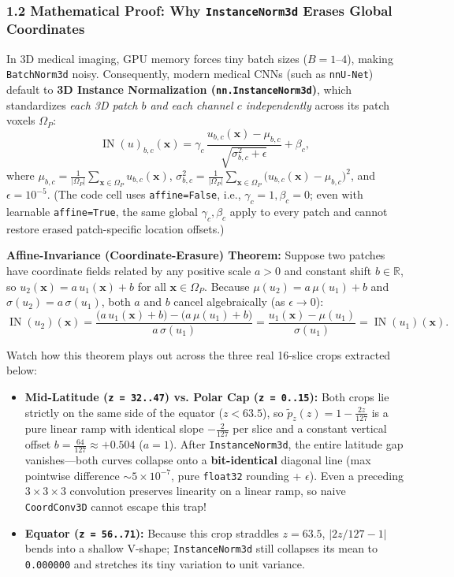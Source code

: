 \documentclass[10pt,a4paper]{article}
\renewcommand{\_}{\origunderscore\allowbreak}
\begin{document}
\subsubsection*{1.2 Mathematical Proof: Why \texttt{InstanceNorm3d} Erases Global Coordinates}
In 3D medical imaging, GPU memory forces tiny batch sizes ($B = 1$--$4$), making \texttt{BatchNorm3d} noisy. Consequently, modern medical CNNs (such as \texttt{nnU-Net}) default to \textbf{3D Instance Normalization (\texttt{nn.InstanceNorm3d})}, which standardizes \textit{each 3D patch $b$ and each channel $c$ independently} across its patch voxels $\Omega_P$:
\[
\operatorname{IN}(u)_{b,c}(\mathbf{x}) = \gamma_c\,\frac{u_{b,c}(\mathbf{x}) - \mu_{b,c}}{\sqrt{\sigma_{b,c}^2 + \epsilon}} + \beta_c,
\]
where $\mu_{b,c} = \frac{1}{|\Omega_P|}\sum_{\mathbf{x} \in \Omega_P} u_{b,c}(\mathbf{x})$, $\sigma_{b,c}^2 = \frac{1}{|\Omega_P|}\sum_{\mathbf{x} \in \Omega_P} \bigl(u_{b,c}(\mathbf{x}) - \mu_{b,c}\bigr)^2$, and $\epsilon = 10^{-5}$. (The code cell uses \texttt{affine=False}, i.e., $\gamma_c = 1, \beta_c = 0$; even with learnable \texttt{affine=True}, the same global $\gamma_c, \beta_c$ apply to every patch and cannot restore erased patch-specific location offsets.)

\textbf{Affine-Invariance (Coordinate-Erasure) Theorem:} Suppose two patches have coordinate fields related by any positive scale $a > 0$ and constant shift $b \in \mathbb{R}$, so $u_2(\mathbf{x}) = a\,u_1(\mathbf{x}) + b$ for all $\mathbf{x} \in \Omega_P$. Because $\mu(u_2) = a\,\mu(u_1) + b$ and $\sigma(u_2) = a\,\sigma(u_1)$, both $a$ and $b$ cancel algebraically (as $\epsilon \to 0$):
\[
\operatorname{IN}(u_2)(\mathbf{x}) = \frac{\bigl(a\,u_1(\mathbf{x}) + b\bigr) - \bigl(a\,\mu(u_1) + b\bigr)}{a\,\sigma(u_1)} = \frac{u_1(\mathbf{x}) - \mu(u_1)}{\sigma(u_1)} = \operatorname{IN}(u_1)(\mathbf{x}).
\]

Watch how this theorem plays out across the three real 16-slice crops extracted below:
\begin{itemize}
\item \textbf{Mid-Latitude (\texttt{z = 32..47}) vs. Polar Cap (\texttt{z = 0..15}):} Both crops lie strictly on the same side of the equator ($z < 63.5$), so $\tilde{p}_z(z) = 1 - \frac{2z}{127}$ is a pure linear ramp with identical slope $-\frac{2}{127}$ per slice and a constant vertical offset $b = \frac{64}{127} \approx +0.504$ ($a = 1$). After \texttt{InstanceNorm3d}, the entire latitude gap vanishes---both curves collapse onto a \textbf{bit-identical} diagonal line (max pointwise difference $\sim 5 \times 10^{-7}$, pure \texttt{float32} rounding + $\epsilon$). Even a preceding $3 \times 3 \times 3$ convolution preserves linearity on a linear ramp, so naive \texttt{CoordConv3D} cannot escape this trap!
\item \textbf{Equator (\texttt{z = 56..71}):} Because this crop straddles $z = 63.5$, $|2z/127 - 1|$ bends into a shallow V-shape; \texttt{InstanceNorm3d} still collapses its mean to \texttt{0.000000} and stretches its tiny variation to unit variance.
\end{itemize}
\end{document}
